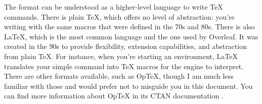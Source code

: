 The format can be understood as a higher-level language to write \TeX{} commands. There is plain \TeX{}, which offers no level of abstraction: you're writing with the same \glspl{macro} that were defined in the 70s and 80s. There is also \LaTeX, which is the most common language and the one used by Overleaf. It was created in the 90s to provide flexibility, extension capabilities, and abstraction from plain \TeX. For instance, when you're starting an \gls{environment}, \LaTeX{} translates your simple \gls{command} into \TeX{} \glspl{macro} for the engine to interpret. There are other formats available, such as Op\TeX, though I am much less familiar with those and would prefer not to misguide you in this document. You can find more information about Op\TeX{} in its \gls{CTAN} documentation \parencite{web:ctan-optex}.